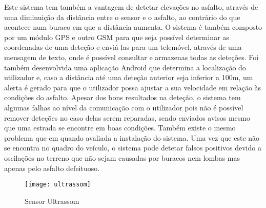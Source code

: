 Este sistema tem também a vantagem de detetar elevações no asfalto, através de uma diminuição da distância entre o sensor e o asfalto, ao contrário do que acontece num buraco em que a distância aumenta.
O sistema é também composto por um módulo GPS e outro GSM para que seja possível determinar as coordenadas de uma deteção e enviá-las para um telemóvel, através de uma mensagem de texto, onde é possível consultar e armazenas todas as deteções.
Foi também desenvolvida uma aplicação Android que determina a localização do utilizador e, caso a distância até uma deteção anterior seja inferior a 100m, um alerta é gerado para que o utilizador possa ajustar a sua velocidade em relação às condições do asfalto.
Apesar dos bons resultados na deteção, o sistema tem algumas falhas ao nível da comunicação com o utilizador pois não é possível remover deteções no caso delas serem reparadas, sendo enviados avisos mesmo que uma estrada se encontre em boas condições.
Também existe o mesmo problema que em \cite{Hegde2015} quando avaliada a instalação do sistema. Uma vez que este não se encontra no quadro do veículo, o sistema pode detetar falsos positivos devido a oscilações no terreno que não sejam causadas por buracos nem lombas mas apenas pelo asfalto defeituoso.

\begin{figure}[hbtp]
	\centering
	\texttt{[image: ultrassom]}
	\caption{Sensor Ultrassom}
	\label{fig:sensor_ultrassom}
\end{figure}

